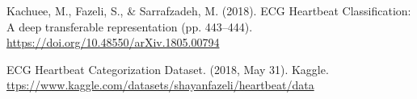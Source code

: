 \newpage
\begin{thebibliography}{}
    Kachuee, M., Fazeli, S., & Sarrafzadeh, M. (2018). ECG Heartbeat Classification: A deep transferable representation (pp. 443–444). 
    \url{https://doi.org/10.48550/arXiv.1805.00794}

    ECG Heartbeat Categorization Dataset. (2018, May 31). Kaggle.
    \url{ttps://www.kaggle.com/datasets/shayanfazeli/heartbeat/data}
\end{thebibliography}
\clearpage